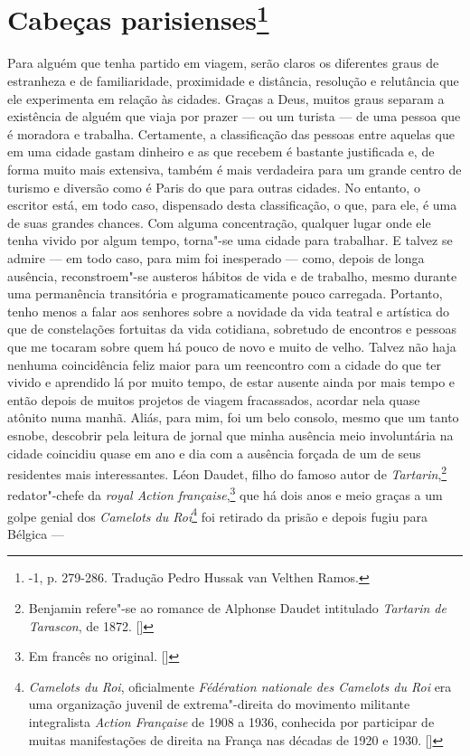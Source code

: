 \chapter{Cabeças parisienses\footnote[*]{-1, p.
  279-286. Tradução Pedro Hussak van Velthen Ramos.}}

Para alguém que tenha partido em viagem, serão claros os diferentes
graus de estranheza e de familiaridade, proximidade e distância,
resolução e relutância que ele experimenta em relação às cidades. Graças
a Deus, muitos graus separam a existência de alguém que viaja por prazer
--- ou um turista --- de uma pessoa que é moradora e trabalha. Certamente, a
classificação das pessoas entre aquelas que em uma cidade gastam
dinheiro e as que recebem é bastante justificada e, de forma muito mais
extensiva, também é mais verdadeira para um grande centro de turismo e
diversão como é Paris do que para outras cidades. No entanto, o escritor
está, em todo caso, dispensado desta classificação, o que, para ele, é
uma de suas grandes chances. Com alguma concentração, qualquer lugar
onde ele tenha vivido por algum tempo, torna"-se uma cidade para
trabalhar. E talvez se admire --- em todo caso, para mim foi inesperado
--- como, depois de longa ausência, reconstroem"-se austeros hábitos de
vida e de trabalho, mesmo durante uma permanência transitória e
programaticamente pouco carregada. Portanto, tenho menos a falar aos
senhores sobre a novidade da vida teatral e artística do que de
constelações fortuitas da vida cotidiana, sobretudo de encontros e
pessoas que me tocaram sobre quem há pouco de novo e muito de velho.
Talvez não haja nenhuma coincidência feliz maior para um reencontro com
a cidade do que ter vivido e aprendido lá por muito tempo, de estar
ausente ainda por mais tempo e então depois de muitos projetos de viagem
fracassados, acordar nela quase atônito numa manhã. Aliás, para mim, foi
um belo consolo, mesmo que um tanto esnobe, descobrir pela leitura de
jornal que minha ausência meio involuntária na cidade coincidiu quase em
ano e dia com a ausência forçada de um de seus residentes mais
interessantes. Léon Daudet, filho do famoso autor de
\emph{Tartarin},\footnote{Benjamin refere"-se ao romance de Alphonse
  Daudet intitulado \emph{Tartarin de Tarascon}, de 1872. []} redator"-chefe
da \emph{royal Action française},\footnote{Em francês no original. []} que há dois anos e meio graças a um golpe genial dos
\emph{Camelots du Roi}\footnote{\emph{Camelots du Roi},
  oficialmente \emph{Fédération nationale des Camelots du Roi} era uma
  organização juvenil de extrema"-direita do movimento militante
  integralista \emph{Action Française} de 1908 a 1936, conhecida por
  participar de muitas manifestações de direita na França nas décadas de
  1920 e 1930. []} foi retirado da prisão e depois fugiu para Bélgica ---
